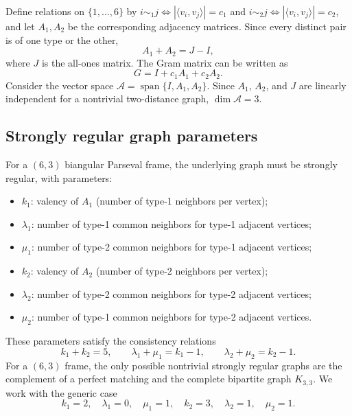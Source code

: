\documentclass[a4paper]{amsart}
\theoremstyle{plain}
\theoremstyle{definition}
\theoremstyle{remark}
\newcommand{\CA}{\mathcal{A}}
\begin{document}
	Define relations on $\{1,\dots,6\}$ by $i\sim_1 j \iff |\langle v_i,v_j\rangle| = c_1$ and $i\sim_2 j \iff |\langle v_i,v_j\rangle| = c_2$, and let $A_1,A_2$ be the corresponding adjacency matrices. Since every distinct pair is of one type or the other,
	\[
	A_1 + A_2 = J - I,
	\]
	where $J$ is the all-ones matrix. The Gram matrix can be written as
	\begin{equation}
		G = I + c_1 A_1 + c_2 A_2. \label{eq:gram-matrix}
	\end{equation}
	Consider the vector space $\CA = \operatorname{span}\{I, A_1, A_2\}$. Since $A_1$, $A_2$, and $J$ are linearly independent for a nontrivial two-distance graph, $\dim\CA = 3$.
	
	\subsection{Strongly regular graph parameters}
	\label{subsec:srg}
	
	For a $(6,3)$ biangular Parseval frame, the underlying graph must be strongly regular, with parameters:
	\begin{itemize}
		\item $k_1$: valency of $A_1$ (number of type-1 neighbors per vertex);
		\item $\lambda_1$: number of type-1 common neighbors for type-1 adjacent vertices;
		\item $\mu_1$: number of type-2 common neighbors for type-1 adjacent vertices;
		\item $k_2$: valency of $A_2$ (number of type-2 neighbors per vertex);
		\item $\lambda_2$: number of type-2 common neighbors for type-2 adjacent vertices;
		\item $\mu_2$: number of type-1 common neighbors for type-2 adjacent vertices.
	\end{itemize}
	These parameters satisfy the consistency relations
	\[
	k_1 + k_2 = 5, \qquad \lambda_1 + \mu_1 = k_1 - 1, \qquad \lambda_2 + \mu_2 = k_2 - 1.
	\]
	For a $(6,3)$ frame, the only possible nontrivial strongly regular graphs are the complement of a perfect matching and the complete bipartite graph $K_{3,3}$. We work with the generic case
	\begin{equation}
		k_1 = 2,\quad \lambda_1 = 0,\quad \mu_1 = 1,\quad k_2 = 3,\quad \lambda_2 = 1,\quad \mu_2 = 1. \label{eq:srg-params}
	\end{equation}
	
\end{document}
